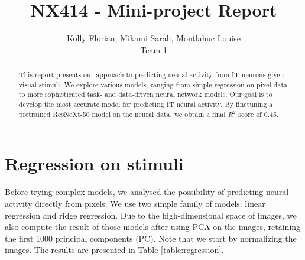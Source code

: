 \documentclass[10pt,conference,compsocconf]{IEEEtran}
\begin{document}
\title{\vspace*{-2em}NX414 - Mini-project Report\vspace*{-1.8em}}

\author{
  Kolly Florian, Mikami Sarah, Montlahuc Louise \\
  Team 1
}

\maketitle

\begin{abstract}
    This report presents our approach to predicting neural activity from IT neurons given visual stimuli. We explore various models, ranging from simple regression on pixel data to more sophisticated task- and data-driven neural network models. Our goal is to develop the most accurate model for predicting IT neural activity. By finetuning a pretrained ResNeXt-50 model on the neural data, we obtain a final \(R^2\) score of 0.45.
\end{abstract}


\section{Regression on stimuli}
Before trying complex models, we analysed the possibility of predicting neural activity directly from pixels. We use two simple family of models: linear regression and ridge regression. Due to the high-dimensional space of images, we also compute the result of those models after using PCA on the images, retaining the first 1000 principal components (PC). Note that we start by normalizing the images. The results are presented in Table \ref{table:regression}.
\end{document}
